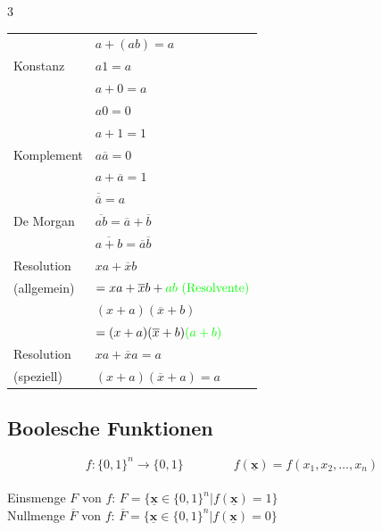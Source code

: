 \documentclass[6pt,a4paper]{scrartcl}
\renewcommand{\vec}[1]{\ensuremath{\underline{\boldsymbol {#1}}}}
\newcommand{\lighthline}{\noalign{\global\arrayrulewidth=0.005pt}\hline\noalign{\global\arrayrulewidth=0.4pt}}
\newcommand{\ra}[0]{\ensuremath{\rightarrow}} 									%
\renewcommand{\vec}[1]{\ensuremath{\underline{\boldsymbol {#1}}}}
\begin{document}
\begin{multicols*}{3}
\begin{sectionbox}
\begin{tabular}{l|l}
			            & $a + (a b) = a$                                                       \\ \lighthline
			Konstanz    & $a 1 = a$                                                             \\
			            & $a + 0 = a$                                                           \\
			            & $a 0 = 0$                                                             \\
			            & $a + 1 = 1$                                                           \\ \lighthline
			Komplement  & $a \overline{a} = 0$                                                  \\
			            & $a + \overline{a} = 1$                                                \\
			            & $\overline{\overline{a}} = a$                                         \\ \lighthline
			De Morgan   & $\overline{a b} = \overline{a} + \overline{b}$                        \\
			            & $\overline{a + b} = \overline{a} \overline{b}$                        \\ \lighthline
			Resolution  & $xa + \overline{x} b$                                                 \\
			(allgemein) & $= x a + \overline{x} b + \textcolor{green}{ab \text{ (Resolvente)}}$ \\
			            & $(x + a) (\overline{x} + b)$                                          \\
			            & $= (x + a) (\overline{x} + b) \textcolor{green}{(a + b)}$             \\ \lighthline
			Resolution  & $xa + \overline{x} a = a$                                             \\
			(speziell)  & $(x + a) (\overline{x} + a) = a$
		\end{tabular}
	\end{sectionbox}


	\subsection{Boolesche Funktionen}
	\begin{equation*}
		f:\{0,1\}^n\ra \{0,1\} \qquad \qquad f(\vec{x})=f(x_1,x_2,\dots,x_n)
	\end{equation*} \\
	Einsmenge $F$ von $f$: $F=\{\vec{x}\in \{0,1\}^n|f(\vec{x})=1\}$ \\
	Nullmenge $\overline F$ von $f$: $\overline F=\{\vec{x}\in \{0,1\}^n|f(\vec{x})=0\}$

\end{multicols*}
\end{document}
